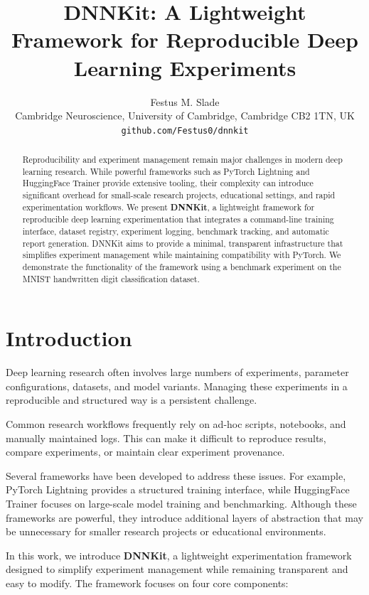 \documentclass{article}
\title{DNNKit: A Lightweight Framework for Reproducible Deep Learning Experiments}
\author{
Festus M. Slade \\
Cambridge Neuroscience, University of Cambridge, Cambridge CB2 1TN, UK \\
\texttt{github.com/Festus0/dnnkit}
}
\begin{document}
\maketitle

\begin{abstract}
Reproducibility and experiment management remain major challenges in modern deep learning research.
While powerful frameworks such as PyTorch Lightning and HuggingFace Trainer provide extensive tooling,
their complexity can introduce significant overhead for small-scale research projects, educational settings,
and rapid experimentation workflows.
We present \textbf{DNNKit}, a lightweight framework for reproducible deep learning experimentation that integrates
a command-line training interface, dataset registry, experiment logging, benchmark tracking,
and automatic report generation.
DNNKit aims to provide a minimal, transparent infrastructure that simplifies experiment management
while maintaining compatibility with PyTorch.
We demonstrate the functionality of the framework using a benchmark experiment on the MNIST handwritten
digit classification dataset.
\end{abstract}

\section{Introduction}

Deep learning research often involves large numbers of experiments, parameter configurations,
datasets, and model variants.
Managing these experiments in a reproducible and structured way is a persistent challenge.

Common research workflows frequently rely on ad-hoc scripts, notebooks, and manually maintained logs.
This can make it difficult to reproduce results, compare experiments, or maintain clear experiment provenance.

Several frameworks have been developed to address these issues.
For example, PyTorch Lightning provides a structured training interface,
while HuggingFace Trainer focuses on large-scale model training and benchmarking.
Although these frameworks are powerful, they introduce additional layers of abstraction
that may be unnecessary for smaller research projects or educational environments.

In this work, we introduce \textbf{DNNKit}, a lightweight experimentation framework designed
to simplify experiment management while remaining transparent and easy to modify.
The framework focuses on four core components:
\end{document}
